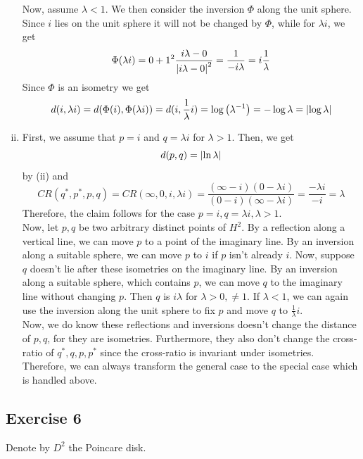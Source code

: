 \documentclass{book}
\begin{document}
\begin{Beweis}{}
\begin{enumerate}[(i)]
		Now, assume $\lambda < 1$. We then consider the inversion $\Phi$ along the unit sphere. Since $i$ lies on the unit sphere it will not be changed by $\Phi$, while for $\lambda i$, we get
		\[ \Phi(\lambda i) = 0 + 1^2 \frac{i\lambda - 0}{\left|i \lambda - 0\right|^2} = \frac{1}{-i\lambda} = i \frac{1}{\lambda} \]
		Since $\Phi$ is an isometry we get
		\[ d(i, \lambda i) = d(\Phi(i), \Phi(\lambda i)) = d(i, \frac{1}{\lambda} i) = \log \left(\lambda^{-1}\right) = - \log \lambda = \left|\log \lambda\right| \]
		\item First, we assume that $p = i$ and $q = \lambda i$ for $\lambda > 1$. Then, we get
		\[ d(p,q) = \left|\ln \lambda\right| \]
		by (ii) and
		\[ CR(q^*, p^*, p, q) = CR( \infty, 0, i, \lambda i ) = \frac{(\infty - i) (0 - \lambda i)}{(0 - i) ( \infty - \lambda i )} = \frac{-\lambda i}{-i} = \lambda \]
		Therefore, the claim follows for the case $p = i, q = \lambda i, \lambda > 1$.\\
		Now, let $p,q$ be two arbitrary distinct points of $H^2$. By a reflection along a vertical line, we can move $p$ to a point of the imaginary line. By an inversion along a suitable sphere, we can move $p$ to $i$ if $p$ isn't already $i$. Now, suppose $q$ doesn't lie after these isometries on the imaginary line. By an inversion along a suitable sphere, which contains $p$, we can move $q$ to the imaginary line without changing $p$. Then $q$ is $i\lambda$ for $\lambda > 0, \neq 1$. If $\lambda < 1$, we can again use the inversion along the unit sphere to fix $p$ and move $q$ to $\frac{1}{\lambda} i$.\\
		Now, we do know these reflections and inversions doesn't change the distance of $p,q$, for they are isometries. Furthermore, they also don't change the cross-ratio of $q^*,q,p,p^*$ since the cross-ratio is invariant under isometries.\\
		Therefore, we can always transform the general case to the special case which is handled above.
	\end{enumerate}
\end{Beweis}

\subsection{Exercise 6}
Denote by $D^2$ the Poincare disk.
\end{document}
